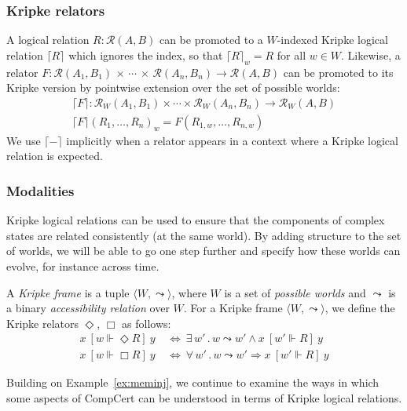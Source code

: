 \documentclass[acmsmall,timestamp,review,anonymous]{acmart}
\newcommand{\ifr}[1]{\ [{#1}]\ }
\begin{document}
\subsubsection{Kripke relators}

A logical relation $R : \mathcal{R}(A, B)$
can be promoted to a $W$-indexed Kripke logical relation $\lceil R \rceil$
which ignores the index, so that $\lceil R \rceil_w = R$ for all $w \in W$.
Likewise,
a relator
  $F : \mathcal{R}(A_1, B_1) \,\times\,\cdots\,\times\,\mathcal{R}(A_n, B_n) \rightarrow \mathcal{R}(A, B)$
can be promoted to its Kripke version
by pointwise extension over the set of possible worlds:
\begin{gather*}
  \lceil F \rceil : \mathcal{R}_W(A_1, B_1) \times \cdots \times \mathcal{R}_W(A_n, B_n) \rightarrow \mathcal{R}_W(A, B) \\
  \lceil F \rceil (R_1, \ldots, R_n)_w = F(R_{1,w}, \ldots, R_{n,w})
\end{gather*}
We use $\lceil - \rceil$ implicitly
when a relator appears in a context where
a Kripke logical relation is expected.

\subsubsection{Modalities}

Kripke logical relations
can be used to ensure that the components of complex states
are related consistently (at the same world).
By adding structure to the set of worlds,
we will be able to go one step further and
specify how these worlds can evolve,
for instance across time.

\begin{definition} %
A \emph{Kripke frame} is a tuple
$\langle W, {\leadsto} \rangle$, where
$W$ is a set of \emph{possible worlds} and
$\leadsto$ is a
binary \emph{accessibility relation} over $W$.
For a Kripke frame
$\langle W, \leadsto \rangle$,
we define the Kripke relators $\Diamond$, $\Box$ as follows:
\begin{align*}
  x \ifr{w \Vdash \Diamond R} y & \: \Leftrightarrow \:
    \exists \, w' \,.\, w \leadsto w' \wedge
      x \ifr{w' \Vdash R} y \\
  x \ifr{w \Vdash \Box R} y & \: \Leftrightarrow \:
    \forall \, w' \,.\, w \leadsto w' \Rightarrow
      x \ifr{w' \Vdash R} y
\end{align*}
\end{definition}

Building on Example~\ref{ex:meminj},
we continue to examine the ways in which
some aspects of CompCert can be understood
in terms of Kripke logical relations.
\end{document}
